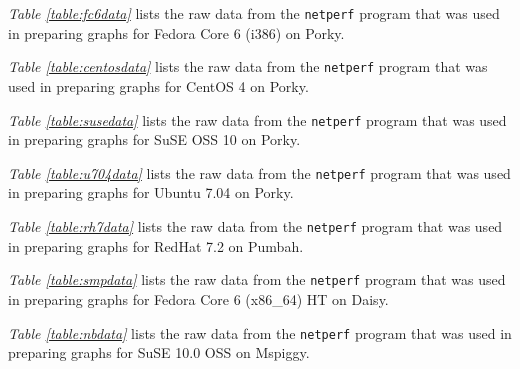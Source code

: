 \documentclass[letterpaper,final,notitlepage,twocolumn,10pt,twoside]{article}
\begin{document}
\begin{appendix}
\textit{Table \ref{table:fc6data}} lists the raw data from the \texttt{netperf} program that was
used in preparing graphs for Fedora Core 6 (i386) on Porky.

\textit{Table \ref{table:centosdata}} lists the raw data from the \texttt{netperf} program that was
used in preparing graphs for CentOS 4 on Porky.

\textit{Table \ref{table:susedata}} lists the raw data from the \texttt{netperf} program that was
used in preparing graphs for SuSE OSS 10 on Porky.


\textit{Table \ref{table:u704data}} lists the raw data from the \texttt{netperf} program that was
used in preparing graphs for Ubuntu 7.04 on Porky.

\textit{Table \ref{table:rh7data}} lists the raw data from the \texttt{netperf} program that was
used in preparing graphs for RedHat 7.2 on Pumbah.

\textit{Table \ref{table:smpdata}} lists the raw data from the \texttt{netperf} program that was
used in preparing graphs for Fedora Core 6 (x86\_64) HT on Daisy.

\textit{Table \ref{table:nbdata}} lists the raw data from the \texttt{netperf} program that was used
in preparing graphs for SuSE 10.0 OSS on Mspiggy.


\end{appendix}
\end{document}
